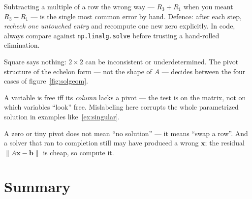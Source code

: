 \begin{tripwire}
Subtracting a multiple of a row the wrong way — $R_3+R_1$ when you meant $R_3-R_1$ — is the single most common error by hand. Defence: after each step, \emph{recheck one untouched entry} and recompute one new zero explicitly. In code, always compare against \texttt{np.linalg.solve} before trusting a hand-rolled elimination.
\end{tripwire}
\begin{tripwire}
Square says nothing: $2\times2$ can be inconsistent or underdetermined. The pivot structure of the echelon form — not the shape of $A$ — decides between the four cases of figure~\ref{fig:solgeom}.
\end{tripwire}
\begin{tripwire}
A variable is free iff its \emph{column} lacks a pivot — the test is on the matrix, not on which variables ``look'' free. Mislabeling here corrupts the whole parametrized solution in examples like~\ref{ex:singular}.
\end{tripwire}
\begin{tripwire}
A zero or tiny pivot does not mean ``no solution'' — it means ``swap a row''. And a solver that ran to completion still may have produced a wrong $\mathbf{x}$; the residual $\|A\mathbf{x}-\mathbf{b}\|$ is cheap, so compute it.
\end{tripwire}

\section{Summary}\label{sec:ch1summary}

